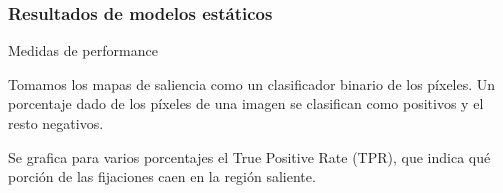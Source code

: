 \documentclass[compress]{beamer}
\begin{document}
\subsubsection{Resultados de modelos estáticos}
\begin{frame}{Medidas de performance}

\begin{itemize}
{\small 
\item Tomamos los mapas de saliencia como un clasificador binario de los píxeles. Un porcentaje dado de los píxeles de una imagen se clasifican como positivos y el resto negativos.
\item Se grafica para varios porcentajes el True Positive Rate (TPR), que indica qué porción de las fijaciones caen en la región saliente.
}
\end{itemize}


\end{frame}
\end{document}
